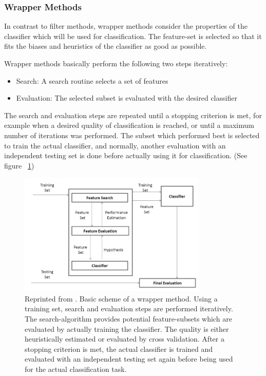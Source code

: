 \subsubsection{Wrapper Methods}
\label{sec:methods.flat.wrapper}


In contrast to filter methods, wrapper methods consider the properties of the classifier which will be used for classification.
The feature-set is selected so that it fits the biases and heuristics of the classifier as good as possible. 

Wrapper methods basically perform the following two steps iteratively: 

\begin{itemize}
  \item Search: A search routine selects a set of features 
  \item Evaluation: The selected subset is evaluated with the desired classifier
\end{itemize}

The search and evaluation steps are repeated until a stopping criterion is met, for example when a desired quality of classification is reached, 
or until a maximum number of iterations was performed. The subset which performed best is selected to train the actual classifier,
and normally, another evaluation with an independent testing set is done before actually using it for classification.
(See figure ~\ref{fig:methods.flat.wrapper.diagramm}) 

\begin{figure}[!ht]
  \centering 
  \includegraphics[width=0.8\textwidth]{chapters/methods/flat/wrapper_diagramm}
  \caption{Reprinted from \cite{Tang:14}. Basic scheme of a wrapper method. Using a training set, search and evaluation steps are performed iteratively.
	The search-algorithm provides potential feature-subsets which are evaluated by actually training the classifier. The quality is either heuristically estimated
	or evaluated by cross validation. After a stopping criterion is met, the actual classifier is trained and evaluated with an independent testing set again before
	being used for the actual classification task.}
  \label{fig:methods.flat.wrapper.diagramm}
\end{figure}

